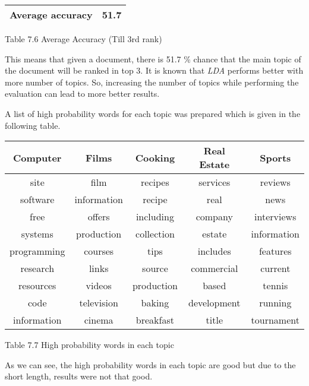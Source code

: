 \begin{center}
\begin{tabular}{ |c|c| }
  \hline
  Average accuracy & 51.7 \\ \hline
\end{tabular}
\end{center}
\begin{center}
 Table 7.6 Average Accuracy (Till 3rd rank)
\end{center}

\par 

This means that given a document, there is 51.7 \% chance that the main topic of the document will be ranked in top 3. It is known
that \textit{LDA} performs better with more number of topics. So, increasing the number of topics while performing the evaluation can 
lead to more better results. 

A list of high probability words for each topic was prepared which is given in the following table. 

\begin{center}
\begin{tabular}{ |c|c|c|c|c| }
  \hline \hline
  Computer & Films & Cooking & Real Estate & Sports \\ \hline \hline
  site & film &	recipes & services & reviews \\ \hline
  software & information & recipe & real & news \\ \hline
  free & offers & including & company &	interviews\\ \hline
  systems & production & collection & estate & information \\ \hline
  programming & courses & tips & includes & features \\ \hline
  research & links & source & commercial & current \\ \hline
  resources & videos & production & based & tennis \\ \hline
  code & television & baking & development & running \\ \hline
  information &	cinema & breakfast & title & tournament \\ \hline
\end{tabular}
\end{center}
\begin{center}
 Table 7.7 High probability words in each topic 
\end{center}

As we can see, the high probability words in each topic are good but due to the short length, results were not that good. 

